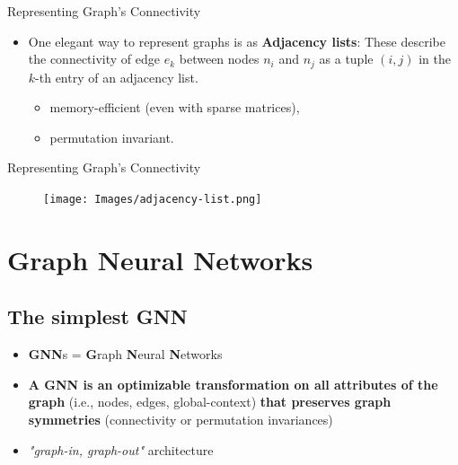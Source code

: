 \documentclass[
    11pt, %
    aspectratio=169, %
]{beamer}
\begin{document}
\begin{frame}{Representing Graph's Connectivity}
    \begin{itemize}
        \item One elegant way to represent graphs is as \textbf{Adjacency lists}: These describe the connectivity of edge $e_k$ between nodes $n_i$ and $n_j$ as a tuple $(i,j)$ in the $k$-th entry of an adjacency list.
        \begin{itemize}
            \item memory-efficient (even with sparse matrices),
            \item permutation invariant.
        \end{itemize}
    \end{itemize}
\end{frame}

\begin{frame}{Representing Graph's Connectivity}
    \begin{figure}
        \centering
        \texttt{[image: Images/adjacency-list.png]}
    \end{figure}
\end{frame}

\section{Graph Neural Networks}
\subsection{The simplest GNN}
\begin{frame}{}
    \begin{itemize}
        \item \textbf{GNN}s = \textbf{G}raph \textbf{N}eural \textbf{N}etworks
        \item \textbf{A GNN is an optimizable transformation on all attributes of the graph }(i.e., nodes, edges, global-context) \textbf{that preserves graph symmetries} (connectivity or permutation invariances)
        \item \textit{"graph-in, graph-out"} architecture
    \end{itemize}
\end{frame}
\end{document}
